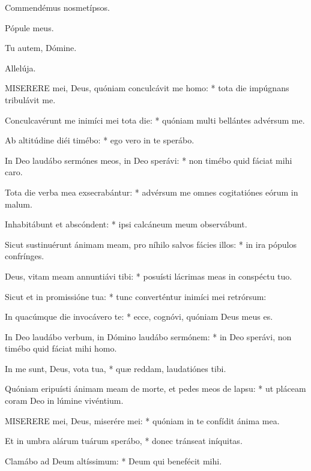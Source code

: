 
 Commendémus nosmetípsos.


 Pópule meus.


 Tu autem, Dómine.

  Allelúja.


\lettrine[lines=2]{M}{ISERERE} mei, Deus, quóniam conculcávit me homo: * tota die impúgnans tribulávit me.

Conculcavérunt me inimíci mei tota die: * quóniam multi bellántes advérsum me.

Ab altitúdine diéi timébo: * ego vero in te sperábo.

In Deo laudábo sermónes meos, in Deo sperávi: * non timébo quid fáciat mihi caro.

Tota die verba mea exsecrabántur: * advérsum me omnes cogitatiónes eórum in malum.

Inhabitábunt et abscóndent: * ipsi calcáneum meum observábunt.

Sicut sustinuérunt ánimam meam, pro níhilo salvos fácies illos: * in ira pópulos confrínges.

Deus, vitam meam annuntiávi tibi: * posuísti lácrimas meas in conspéctu tuo.

Sicut et in promissióne tua: * tunc converténtur inimíci mei retrórsum:

In quacúmque die invocávero te: * ecce, cognóvi, quóniam Deus meus es.

In Deo laudábo verbum, in Dómino laudábo sermónem: * in Deo sperávi, non timébo quid fáciat mihi homo.

In me sunt, Deus, vota tua, * quæ reddam, laudatiónes tibi.

Quóniam eripuísti ánimam meam de morte, et pedes meos de lapsu: * ut pláceam coram Deo in lúmine vivéntium.


\lettrine[lines=2]{M}{ISERERE} mei, Deus, miserére mei: * quóniam in te confídit ánima mea.

Et in umbra alárum tuárum sperábo, * donec tránseat iníquitas.

Clamábo ad Deum altíssimum: * Deum qui benefécit mihi.

